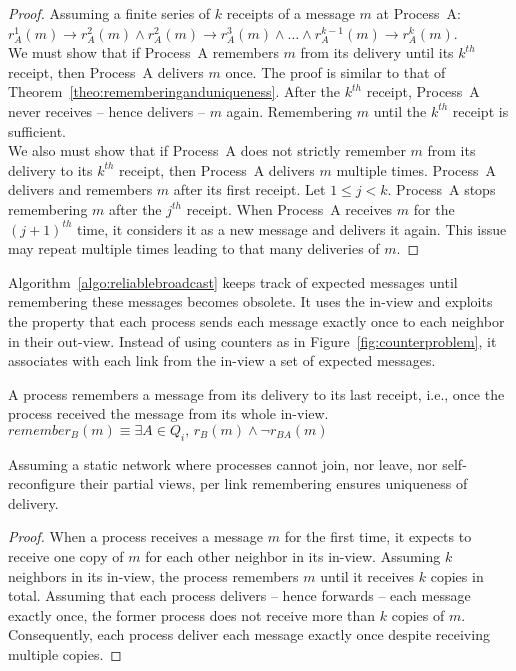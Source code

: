 \begin{proof}
  Assuming a finite series of $k$ receipts of a message $m$ at Process~A:
  $r^1_A(m) \rightarrow r^2_A(m) \wedge r^2_A(m) \rightarrow r^3_A(m) \wedge
  \ldots \wedge r^{k-1}_A(m) \rightarrow r^k_A(m)$. \\
  We must show that if Process~A remembers $m$ from its delivery until its
  $k^{th}$ receipt, then Process~A delivers $m$ once. The proof is similar to
  that of Theorem~\ref{theo:rememberinganduniqueness}. After the $k^{th}$
  receipt, Process~A never receives -- hence delivers -- $m$ again. Remembering
  $m$ until the $k^{th}$ receipt is sufficient.\\
  We also must show that if Process~A does not strictly remember $m$ from its
  delivery to its $k^{th}$ receipt, then Process~A delivers $m$ multiple
  times. Process~A delivers and remembers $m$ after its first receipt. Let
  $1\leq j<k$. Process~A stops remembering $m$ after the $j^{th}$ receipt. When
  Process~A receives $m$ for the $(j+1)^{th}$ time, it considers it as a new
  message and delivers it again. This issue may repeat multiple times leading to
  that many deliveries of $m$.
\end{proof}

Algorithm~\ref{algo:reliablebroadcast} keeps track of expected messages until
remembering these messages becomes obsolete. %
It uses the in-view and exploits the property that each process sends each
message exactly once to each neighbor in their out-view.  Instead of using
counters as in Figure~\ref{fig:counterproblem}, it associates with each link
from the in-view a set of expected messages.

\begin{definition}
  A process remembers a message from its delivery to its last receipt, i.e.,
  once the process received the message from its whole in-view.
  $remember_B(m) \equiv \exists A \in Q_i,\, r_B(m) \wedge \neg r_{BA}(m)$
\end{definition}

\begin{lemma}
  Assuming a static network where processes cannot join, nor leave, nor
  self-reconfigure their partial views, per link remembering ensures uniqueness
  of delivery.
\end{lemma}

\begin{proof}
  When a process receives a message $m$ for the first time, it expects to
  receive one copy of $m$ for each other neighbor in its in-view. Assuming $k$
  neighbors in its in-view, the process remembers $m$ until it receives $k$
  copies in total. Assuming that each process delivers -- hence forwards -- each
  message exactly once, the former process does not receive more than $k$ copies
  of $m$. Consequently, each process deliver each message exactly once despite
  receiving multiple copies.
\end{proof}

